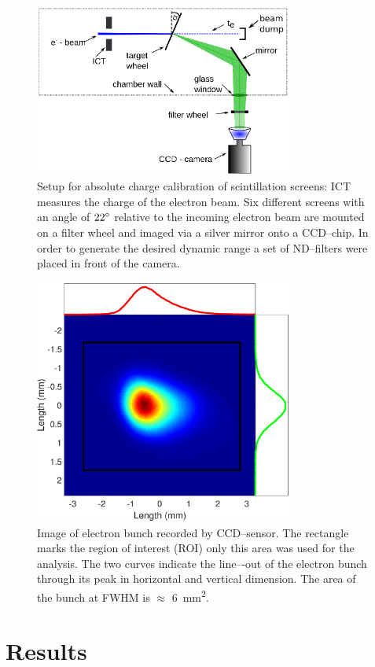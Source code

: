 \documentclass[%
reprint,
amsmath,
amssymb,
aip,
rsi, 
numerical,
floatfix,
]{revtex4-1}
\begin{document}
\begin{figure}
\includegraphics[width=8.5cm]{./Figures/Setup_V2}%
\caption{\label{fig:Setup}Setup for absolute charge calibration of scintillation screens: ICT measures the charge of the electron beam. 
Six different screens with an angle of $22\degree$ relative to the incoming electron beam are mounted on a filter wheel and imaged via a silver mirror onto a CCD--chip.
In order to generate the desired dynamic range a set of ND--filters were placed in front of the camera.}
\end{figure}
\begin{figure}
\includegraphics[width=8.5cm]{./Figures/electron_bunch}%
\caption{\label{fig:electron_bunch}
Image of electron bunch recorded by CCD–sensor. 
The rectangle marks the region of interest (ROI) only this area was used for the analysis. 
The two curves indicate the line–-out of the electron bunch through its peak in
horizontal and vertical dimension. 
The area of the bunch at FWHM is $\approx$ \SI{6}{\square\milli\meter}.}
\end{figure}

\section{\label{Res} Results}
\end{document}
